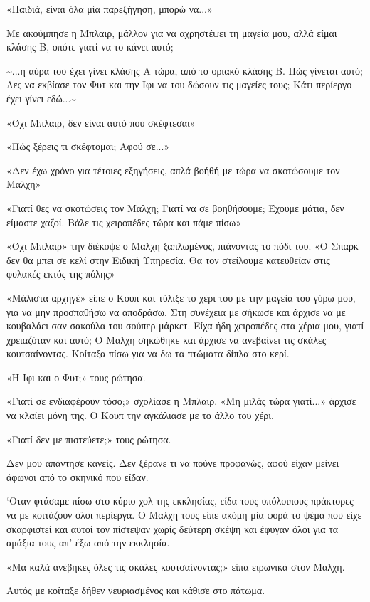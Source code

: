 \documentclass[12pt,twoside, openany]{book}
\begin{document}
«Παιδιά, είναι όλα μία παρεξήγηση, μπορώ να...»

Με ακούμπησε η Μπλαιρ, μάλλον για να αχρηστέψει τη μαγεία μου, αλλά είμαι κλάσης Β, οπότε γιατί να το κάνει αυτό;

\textasciitilde ...η αύρα του έχει γίνει κλάσης Α τώρα, από το οριακό κλάσης Β. Πώς γίνεται αυτό; Λες να εκβίασε τον Φυτ και την Ιφι να του δώσουν τις μαγείες τους; Κάτι περίεργο έχει γίνει εδώ...\textasciitilde 

«Όχι Μπλαιρ, δεν είναι αυτό που σκέφτεσαι»

«Πώς ξέρεις τι σκέφτομαι; Αφού σε...»

«Δεν έχω χρόνο για τέτοιες εξηγήσεις, απλά βοήθή με τώρα να σκοτώσουμε τον Μαλχη»

«Γιατί θες να σκοτώσεις τον Μαλχη; Γιατί να σε βοηθήσουμε; Έχουμε μάτια, δεν είμαστε χαζοί. Βάλε τις χειροπέδες τώρα και πάμε πίσω»

«Όχι Μπλαιρ» την διέκοψε ο Μαλχη ξαπλωμένος, πιάνοντας το πόδι του. «Ο Σπαρκ δεν θα μπει σε κελί στην Ειδική Υπηρεσία. Θα τον στείλουμε κατευθείαν στις φυλακές εκτός της πόλης»

«Μάλιστα αρχηγέ» είπε ο Κουπ και τύλιξε το χέρι του με την μαγεία του γύρω μου, για να μην προσπαθήσω να αποδράσω. Στη συνέχεια με σήκωσε και άρχισε να με κουβαλάει σαν σακούλα του σούπερ μάρκετ. Είχα ήδη χειροπέδες στα χέρια μου, γιατί χρειαζόταν και αυτό; Ο Μαλχη σηκώθηκε και άρχισε να ανεβαίνει τις σκάλες κουτσαίνοντας. Κοίταξα πίσω για να δω τα πτώματα δίπλα στο κερί.

«Η Ιφι και ο Φυτ;» τους ρώτησα.

«Γιατί σε ενδιαφέρουν τόσο;» σχολίασε η Μπλαιρ. «Μη μιλάς τώρα γιατί...» άρχισε να κλαίει μόνη της. Ο Κουπ την αγκάλιασε με το άλλο του χέρι.

«Γιατί δεν με πιστεύετε;» τους ρώτησα.

Δεν μου απάντησε κανείς. Δεν ξέρανε τι να πούνε προφανώς, αφού είχαν μείνει άφωνοι από το σκηνικό που είδαν.

‘Οταν φτάσαμε πίσω στο κύριο χολ της εκκλησίας, είδα τους υπόλοιπους πράκτορες να με κοιτάζουν όλοι περίεργα. Ο Μαλχη τους είπε ακόμη μία φορά το ψέμα που είχε σκαρφιστεί και αυτοί τον πίστεψαν χωρίς δεύτερη σκέψη και έφυγαν όλοι για τα αμάξια τους απ’ έξω από την εκκλησία.

«Μα καλά ανέβηκες όλες τις σκάλες κουτσαίνοντας;» είπα ειρωνικά στον Μαλχη.

Αυτός με κοίταξε δήθεν νευριασμένος και κάθισε στο πάτωμα.
\end{document}
